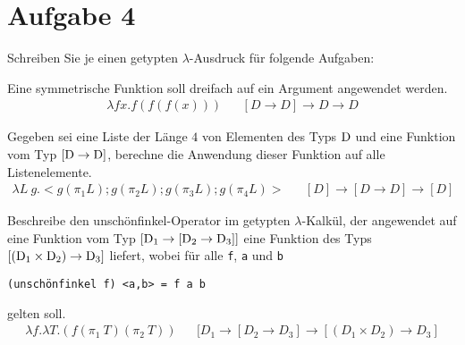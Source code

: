 \documentclass[ngerman,a4paper]{report}
\begin{document}
\section*{Aufgabe 4}
Schreiben Sie je einen getypten $\lambda$-Ausdruck für folgende Aufgaben:
\begin{compactenum}
\item Eine symmetrische Funktion soll dreifach auf ein Argument angewendet werden.
\begin{align*}
	\lambda fx.f(f(f(x)))&& [D \rightarrow D] \rightarrow D \rightarrow D
\end{align*}
\item Gegeben sei eine Liste der Länge $4$ von Elementen des Typs $\text{\lstinline!D!}$ und eine Funktion vom Typ $[\text{\lstinline!D!} \rightarrow \text{\lstinline!D!}]$, berechne die Anwendung dieser Funktion auf alle Listenelemente.
\begin{align*}
	\lambda L\ g.<g(\pi_1L);g(\pi_2L);g(\pi_3L);g(\pi_4L)>&& [D] \rightarrow [D\rightarrow D] \rightarrow [D]
\end{align*}
\item Beschreibe den unschönfinkel-Operator im getypten $\lambda$-Kalkül, der angewendet auf eine Funktion vom Typ $[\text{\lstinline!D!}_1 \rightarrow [\text{\lstinline!D!}_2 \rightarrow \text{\lstinline!D!}_3]]$ eine Funktion des Typs $[(\text{\lstinline!D!}_1 \times \text{\lstinline!D!}_2) \rightarrow \text{\lstinline!D!}_3]$ liefert, wobei für alle \lstinline!f!, \lstinline!a! und \lstinline!b!
\begin{lstlisting}
(unschönfinkel f) <a,b> = f a b
\end{lstlisting}
gelten soll.
\begin{align*}
	\lambda f. \lambda T.(f(\pi_1\ T) (\pi_2\ T))&& [D_1 \rightarrow [D_2 \rightarrow D_3] \rightarrow [(D_1\times D_2)\rightarrow D_3]
\end{align*}
\end{compactenum}
\end{document}
